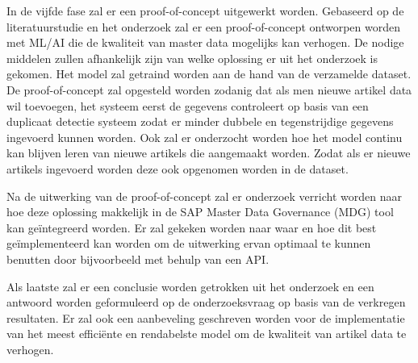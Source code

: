 In de vijfde fase zal er een proof-of-concept uitgewerkt worden. Gebaseerd op de literatuurstudie en het onderzoek zal er een proof-of-concept ontworpen worden met ML/AI die de kwaliteit van master data mogelijks kan verhogen. De nodige middelen zullen afhankelijk zijn van welke oplossing er uit het onderzoek is gekomen. Het model zal getraind worden aan de hand van de verzamelde dataset. De proof-of-concept zal opgesteld worden zodanig dat als men nieuwe artikel data wil toevoegen, het systeem eerst de gegevens controleert op basis van een duplicaat detectie systeem zodat er minder dubbele en tegenstrijdige gegevens ingevoerd kunnen worden. Ook zal er onderzocht worden hoe het model continu kan blijven leren van nieuwe artikels die aangemaakt worden. Zodat als er nieuwe artikels ingevoerd worden deze ook opgenomen worden in de dataset.

Na de uitwerking van de proof-of-concept zal er onderzoek verricht worden naar hoe deze oplossing makkelijk in de SAP Master Data Governance (MDG) tool kan geïntegreerd worden. Er zal gekeken worden naar waar en hoe dit best geïmplementeerd kan worden om de uitwerking ervan optimaal te kunnen benutten door bijvoorbeeld met behulp van een API.

Als laatste zal er een conclusie worden getrokken uit het onderzoek en een antwoord worden geformuleerd op de onderzoeksvraag op basis van de verkregen resultaten. Er zal ook een aanbeveling geschreven worden voor de implementatie van het meest efficiënte en rendabelste model om de kwaliteit van artikel data te verhogen.

